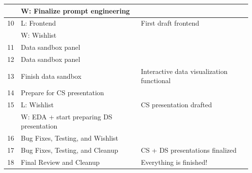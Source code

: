 \documentclass[conference]{IEEEtran}
\begin{document}
\begin{table}[ht]
\begin{center}
\begin{tabularx}{\columnwidth}{|l|X|X|}
& W: Finalize prompt engineering & \\
\hline
10 & L: Frontend &  First draft frontend \\
& W: Wishlist & \\
\hline
11 & Data sandbox panel & \\
\hline
12 & Data sandbox panel & \\
\hline
13 & Finish data sandbox & Interactive data visualization functional \\
\hline
14 & Prepare for CS presentation & \\
\hline
15 & L: Wishlist & CS presentation drafted \\
& W: EDA + start preparing DS presentation & \\
\hline
16 & Bug Fixes, Testing, and Wishlist & \\
\hline
17 & Bug Fixes, Testing, and Cleanup & CS + DS presentations finalized \\ %
\hline
18 & Final Review and Cleanup & Everything is finished! \\ %
\hline
\end{tabularx}
\label{tab:timeline}
\end{center}
\end{table}
\end{document}
